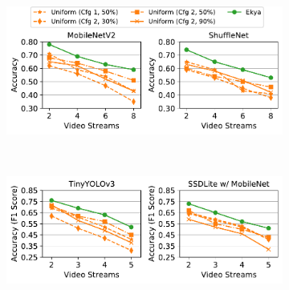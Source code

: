 \begin{figure}[t]
\captionsetup[subfigure]{justification=centering}
  \centering
  \begin{subfigure}[t]{0.9\linewidth}
    \centering
    \includegraphics[width=\linewidth]{ekya/results/generality/e2e_1gpu_cityscapes_objclass.pdf}
    \caption{}
    \label{fig:sys-impl-generality-objclass}
  \end{subfigure}
  \\
  \begin{subfigure}[t]{0.9\linewidth}
    \centering
    \includegraphics[width=\linewidth]{ekya/results/generality/e2e_1gpu_cityscapes_objdet.pdf}
    \caption{}
    \label{fig:sys-impl-generality-objdet}
  \end{subfigure}
  ~~~
  \caption{ }
  \label{fig:generality-models}
\end{figure}

